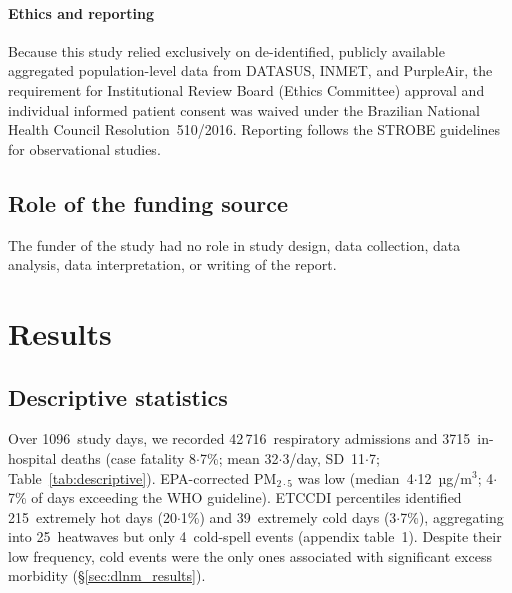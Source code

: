 \documentclass[review,number]{elsarticle}
\begin{document}
\paragraph{Ethics and reporting}
Because this study relied exclusively on de-identified, publicly
available aggregated population-level data from DATASUS, INMET, and
PurpleAir, the requirement for Institutional Review Board (Ethics
Committee) approval and individual informed patient consent was waived
under the Brazilian National Health Council Resolution~510/2016.
Reporting follows the STROBE guidelines for observational
studies.\cite{VonElm2007}

\subsection{Role of the funding source}
The funder of the study had no role in study design, data collection,
data analysis, data interpretation, or writing of the report.

\section{Results}

\subsection{Descriptive statistics}

Over 1096~study days, we recorded 42\,716~respiratory admissions and
3715~in-hospital deaths (case fatality 8${\cdot}$7\%; mean
32${\cdot}$3/day, SD~11${\cdot}$7; Table~\ref{tab:descriptive}).
EPA-corrected $\text{PM}_{2{\cdot}5}$ was low (median~4${\cdot}$12~µg/m$^3$;
4${\cdot}$7\% of days exceeding the WHO guideline). ETCCDI percentiles
identified 215~extremely hot days (20${\cdot}$1\%) and 39~extremely
cold days (3${\cdot}$7\%), aggregating into 25~heatwaves but only
4~cold-spell events (appendix table~1). Despite their low frequency, cold
events were the only ones associated with significant excess morbidity
(§\ref{sec:dlnm_results}).
\end{document}
